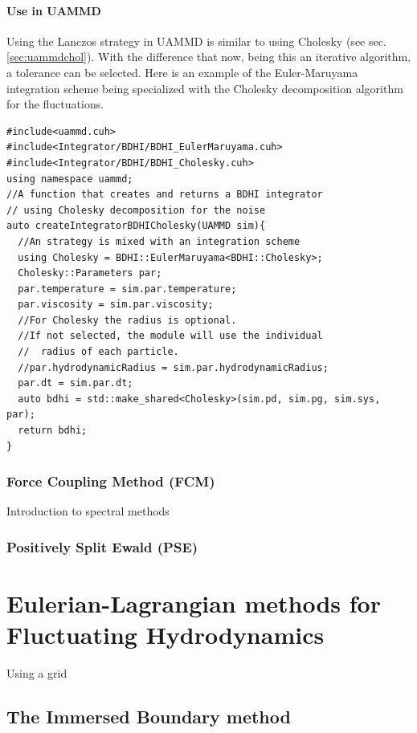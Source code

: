 \documentclass[ twoside,openright,titlepage,numbers=noenddot,%
headinclude,footinclude,cleardoublepage=empty,abstract=on,
BCOR=5mm,paper=a4,fontsize=11pt, dvipsnames
]{scrreprt}
\def\ucpp{uammd_cpp_lexer.py:UAMMDCppLexer -x}
\newcommand{\uammd}{\gls{UAMMD}\xspace}
\begin{document}
\subsubsection{Use in UAMMD}
Using the Lanczos strategy in \uammd is similar to using Cholesky (see sec. \ref{sec:uammdchol}). With the difference that now, being this an iterative algorithm, a tolerance can be selected.
Here is an example of the Euler-Maruyama integration scheme being specialized with the Cholesky decomposition algorithm for the fluctuations.
\begin{verbatim}
#include<uammd.cuh>
#include<Integrator/BDHI/BDHI_EulerMaruyama.cuh>
#include<Integrator/BDHI/BDHI_Cholesky.cuh>
using namespace uammd;
//A function that creates and returns a BDHI integrator
// using Cholesky decomposition for the noise
auto createIntegratorBDHICholesky(UAMMD sim){   
  //An strategy is mixed with an integration scheme
  using Cholesky = BDHI::EulerMaruyama<BDHI::Cholesky>;
  Cholesky::Parameters par;
  par.temperature = sim.par.temperature;
  par.viscosity = sim.par.viscosity;
  //For Cholesky the radius is optional.
  //If not selected, the module will use the individual 
  //  radius of each particle.
  //par.hydrodynamicRadius = sim.par.hydrodynamicRadius;
  par.dt = sim.par.dt;
  auto bdhi = std::make_shared<Cholesky>(sim.pd, sim.pg, sim.sys, par);
  return bdhi;
}
\end{verbatim}

\subsection{Force Coupling Method (FCM)}

Introduction to spectral methods


\subsection{Positively Split Ewald (PSE)}



\chapter{Eulerian-Lagrangian methods for Fluctuating Hydrodynamics}
Using a grid

\section{The Immersed Boundary method}
\end{document}
